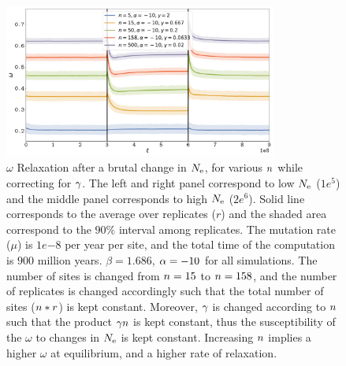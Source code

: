 \documentclass{article}
\begin{document}
\begin{figure}[H]
    \centering
    \includegraphics[width=0.8\textwidth] {Relaxation-Stability-Gamma.pdf}
    \caption[Relaxation time of $\omega$ dependence on $\NbrSites$, while correction for $\DeltaDeltaG$]{
    $\omega$ Relaxation after a brutal change in $N_{\text{e}}$, for various $\NbrSites$ while correcting for $\DeltaDeltaG$.
    The left and right panel correspond to low $N_{\text{e}}$ ($1e^{5}$) and the middle panel corresponds to high $N_{\text{e}}$ ($2e^{6}$).
    Solid line corresponds to the average over replicates ($r$) and the shaded area correspond to the $90\%$ interval among replicates.
    The mutation rate ($\mu$) is $1e{-8}$ per year per site, and the total time of the computation is $900$ million years.
    $\beta=1.686$, $\alpha=-10$ for all simulations. The number of sites is changed from $n=15$ to $n=158$, and the number of replicates is changed accordingly such that the total number of sites ($n*r$) is kept constant.
    Moreover, $\DeltaDeltaG$ is changed according to $\NbrSites$ such that the product $\gamma n$ is kept constant, thus the susceptibility of the $\omega$ to changes in $N_{\text{e}}$ is kept constant.
    Increasing $\NbrSites$ implies a higher $\omega$ at equilibrium, and a higher rate of relaxation.
    }
\end{figure}
\end{document}
